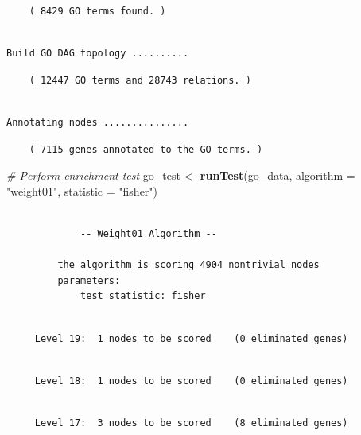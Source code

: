 \documentclass[]{article}
\newenvironment{Shaded}{\begin{snugshade}}{\end{snugshade}}
\newcommand{\KeywordTok}[1]{\textcolor[rgb]{0.13,0.29,0.53}{\textbf{#1}}}
\newcommand{\DataTypeTok}[1]{\textcolor[rgb]{0.13,0.29,0.53}{#1}}
\newcommand{\StringTok}[1]{\textcolor[rgb]{0.31,0.60,0.02}{#1}}
\newcommand{\CommentTok}[1]{\textcolor[rgb]{0.56,0.35,0.01}{\textit{#1}}}
\newcommand{\NormalTok}[1]{#1}
\begin{document}
\begin{verbatim}
    ( 8429 GO terms found. )
\end{verbatim}

\begin{verbatim}

Build GO DAG topology ..........
\end{verbatim}

\begin{verbatim}
    ( 12447 GO terms and 28743 relations. )
\end{verbatim}

\begin{verbatim}

Annotating nodes ...............
\end{verbatim}

\begin{verbatim}
    ( 7115 genes annotated to the GO terms. )
\end{verbatim}

\begin{Shaded}
\begin{Highlighting}[]
\CommentTok{# Perform enrichment test}
\NormalTok{go_test <-}\StringTok{ }\KeywordTok{runTest}\NormalTok{(go_data, }\DataTypeTok{algorithm =} \StringTok{"weight01"}\NormalTok{, }\DataTypeTok{statistic =} \StringTok{"fisher"}\NormalTok{)}
\end{Highlighting}
\end{Shaded}

\begin{verbatim}

             -- Weight01 Algorithm -- 

         the algorithm is scoring 4904 nontrivial nodes
         parameters: 
             test statistic: fisher
\end{verbatim}

\begin{verbatim}

     Level 19:  1 nodes to be scored    (0 eliminated genes)
\end{verbatim}

\begin{verbatim}

     Level 18:  1 nodes to be scored    (0 eliminated genes)
\end{verbatim}

\begin{verbatim}

     Level 17:  3 nodes to be scored    (8 eliminated genes)
\end{verbatim}
\end{document}
